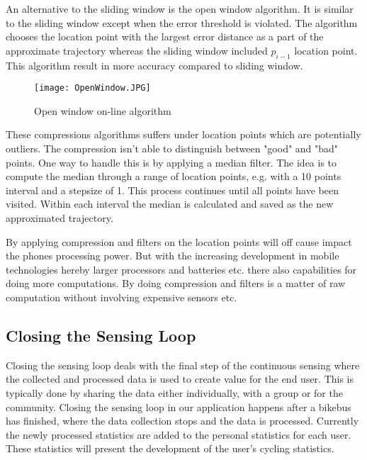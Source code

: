 An alternative to the sliding window is the open window algorithm. It is similar to the sliding window except when the error threshold is violated. The algorithm chooses the location point with the largest error distance as a part of the approximate trajectory whereas the sliding window included $p_{i-1}$ location point. This algorithm result in more accuracy compared to sliding window. 

\begin{figure}[H]
\centering
\texttt{[image: OpenWindow.JPG]}

\caption{Open window on-line algorithm}
\label{fig:open_window_algorithm}
\end{figure}

These compressions algorithms suffers under location points which are potentially outliers. The compression isn't able to distinguish between "good" and "bad" points. One way to handle this is by applying a median filter. The idea is to compute the median through a range of location points, e.g. with a 10 points interval and a stepsize of 1. This process continues until all points have been visited. Within each interval the median is calculated and saved as the new approximated trajectory.

By applying compression and filters on the location points will off cause impact the phones processing power. But with the increasing development in mobile technologies hereby larger processors and batteries etc. there also capabilities for doing more computations. By doing compression and filters is a matter of raw computation without involving expensive sensors etc.       
\iffalse
Suggestions for further processing:
\begin{itemize}
    \item Median filtering
    \item Advanced statistics calculations (analyse per interval)
    \item Algorithm to balance the trade-off between processing space and time (Appendix \ref{app:processing_algorithm})
\end{itemize}
\fi

\subsection{Closing the Sensing Loop}
\label{section:Closing_the_sensing_loop}
Closing the sensing loop deals with the final step of the continuous sensing where the collected and processed data is used to create value for the end user.
This is typically done by sharing the data either individually, with a group or for the community. 
Closing the sensing loop in our application happens after a bikebus has finished, where the data collection stops and the data is processed. Currently the newly processed statistics are added to the personal statistics for each user. These statistics will present the development of the user's cycling statistics.

